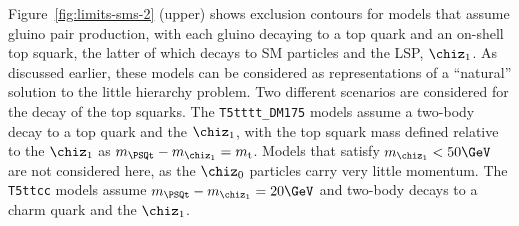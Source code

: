 Figure~\ref{fig:limits-sms-2} (upper) shows exclusion contours for
models that assume gluino pair production, with each gluino decaying
to a top quark and an on-shell top squark, the latter of which decays
to SM particles and the LSP, $\chiz_1$. As discussed earlier, these
models can be considered as representations of a ``natural'' solution
to the little hierarchy problem. Two different scenarios are
considered for the decay of the top squarks. The
\texttt{T5tttt\_DM175} models assume a two-body decay to a top quark
and the $\chiz_1$, with the top squark mass defined relative to the
$\chiz_1$ as $m_{\PSQt} - m_{\chiz_1} = m_\text{t}$. Models that
satisfy $m_{\chiz_1} < 50\GeV$ are not considered here, as the
$\chiz_0$ particles carry very little momentum.  The \texttt{T5ttcc}
models assume $m_{\PSQt} - m_{\chiz_1} = 20\GeV$ and two-body decays
to a charm quark and the $\chiz_1$.

